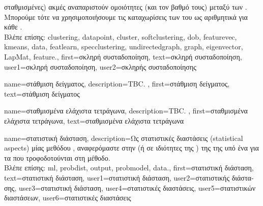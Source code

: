 {{{		σταθμισμένες) ακμές αναπαριστούν ομοιότητες (και τον βαθμό τους) μεταξύ των} . 
		\foreignlanguage{greek}{Μπορούμε τότε να χρησιμοποιήσουμε τις καταχωρίσεις των}  
		\foreignlanguage{greek}{του}  \foreignlanguage{greek}{ως αριθμητικά}  
		\foreignlanguage{greek}{για κάθε} .
		\\
		\foreignlanguage{greek}{Βλέπε επίσης:} \gls{clustering}, \gls{datapoint}, \gls{cluster}, \gls{softclustering}, \gls{dob}, \gls{featurevec}, \gls{kmeans}, 
		\gls{data}, \gls{featlearn}, \gls{specclustering}, \gls{undirectedgraph}, \gls{graph}, \gls{eigenvector}, \gls{LapMat}, \gls{feature}.},
	first={\foreignlanguage{greek}{σκληρή συσταδοποίηση}},
	text={\foreignlanguage{greek}{σκληρή συσταδοποίηση}},
	user1={\foreignlanguage{greek}{σκληρή συσταδοποίηση}}, %
	user2={\foreignlanguage{greek}{σκληρής συσταδοποί\-ησης}} %
}

{name={\foreignlanguage{greek}{στάθμιση δείγματος}}, 
	description={TBC. },
	first={\foreignlanguage{greek}{στάθμιση δείγματος}}, 
	text={\foreignlanguage{greek}{στάθμιση δείγματος}}
}

{name={\foreignlanguage{greek}{σταθμισμένα ελάχιστα τετράγωνα}},
	description={TBC. },
	first={\foreignlanguage{greek}{σταθμισμένα ελάχιστα τετράγωνα}},
	text={\foreignlanguage{greek}{σταθμισμένα ελάχιστα τετράγωνα}}
}

{name={\foreignlanguage{greek}{στατιστική διάσταση}}, 
	description={\foreignlanguage{greek}{Ως στατιστικές διαστάσεις} (statistical aspects) 
		\foreignlanguage{greek}{μίας μεθόδου} , \foreignlanguage{greek}{αναφερόμαστε στην}  
		\foreignlanguage{greek}{(ή σε ιδιότητες της} ) \foreignlanguage{greek}{της}  
		\foreignlanguage{greek}{της υπό ένα}  \foreignlanguage{greek}{για τα}  
		\foreignlanguage{greek}{που τροφοδοτούνται στη μέθοδο.} 
		\\
		\foreignlanguage{greek}{Βλέπε επίσης:} \gls{ml}, \gls{probdist}, \gls{output}, \gls{probmodel}, \gls{data}.},
	first={\foreignlanguage{greek}{στατιστική διάσταση}},
	text={\foreignlanguage{greek}{στατιστική διάσταση}},
	user1={\foreignlanguage{greek}{στατιστική διάσταση}}, %
	user2={\foreignlanguage{greek}{στατιστικής διάστασης}}, %
	user3={\foreignlanguage{greek}{στατιστική διάσταση}}, %
	user4={\foreignlanguage{greek}{στατιστικές διαστάσεις}}, %
	user5={\foreignlanguage{greek}{στατιστικών διαστάσεων}}, %
	user6={\foreignlanguage{greek}{στατιστικές διαστάσεις}} %
}

